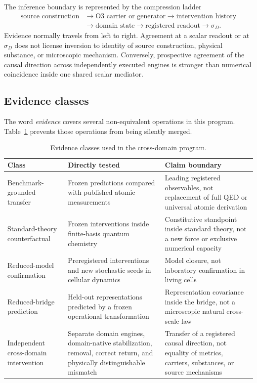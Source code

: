 \documentclass[11pt,a4paper]{article}
\begin{document}
The inference boundary is represented by the compression ladder
\begin{equation}
 \begin{aligned}
 \text{source construction}
 &\longrightarrow \text{O3 carrier or generator}
 \longrightarrow \text{intervention history}\\
 &\longrightarrow \text{domain state}
 \longrightarrow \text{registered readout}
 \longrightarrow \sigma_D.
 \end{aligned}
 \label{eq:compression-ladder}
\end{equation}
Evidence normally travels from left to right. Agreement at a scalar readout or at $\sigma_D$ does not license inversion to identity of source construction, physical substance, or microscopic mechanism. Conversely, prospective agreement of the causal direction across independently executed engines is stronger than numerical coincidence inside one shared scalar mediator.

\subsection{Evidence classes}

The word \emph{evidence} covers several non-equivalent operations in this program. Table~\ref{tab:evidence-classes} prevents those operations from being silently merged.

\begin{table}[H]
\centering
\footnotesize
\caption{Evidence classes used in the cross-domain program.}
\label{tab:evidence-classes}
\begin{tabularx}{\textwidth}{@{}>{\raggedright\arraybackslash}p{2.8cm}>{\raggedright\arraybackslash}X>{\raggedright\arraybackslash}p{4.1cm}@{}}
\toprule
Class & Directly tested & Claim boundary \\
\midrule
Benchmark-grounded transfer & Frozen predictions compared with published atomic measurements & Leading registered observables, not replacement of full QED or universal atomic derivation \\
Standard-theory counterfactual & Frozen interventions inside finite-basis quantum chemistry & Constitutive standpoint inside standard theory, not a new force or exclusive numerical capacity \\
Reduced-model confirmation & Preregistered interventions and new stochastic seeds in cellular dynamics & Model closure, not laboratory confirmation in living cells \\
Reduced-bridge prediction & Held-out representations predicted by a frozen operational transformation & Representation covariance inside the bridge, not a microscopic natural cross-scale law \\
Independent cross-domain intervention & Separate domain engines, domain-native stabilization, removal, correct return, and physically distinguishable mismatch & Transfer of a registered causal direction, not equality of metrics, carriers, substances, or source mechanisms \\
\bottomrule
\end{tabularx}
\end{table}
\end{document}
